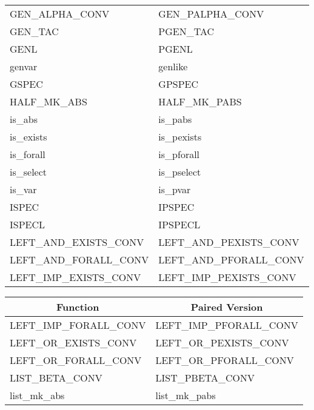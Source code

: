 {\begin{center}
\begin{tabular}[t]{|l|l|}
        GEN\_ALPHA\_CONV            &   GEN\_PALPHA\_CONV           \\
        GEN\_TAC                    &   PGEN\_TAC                   \\
        GENL                        &   PGENL                       \\
        genvar                      &   genlike                     \\
        GSPEC                       &   GPSPEC                      \\
        HALF\_MK\_ABS               &   HALF\_MK\_PABS              \\
        is\_abs                     &   is\_pabs                    \\
        is\_exists                  &   is\_pexists                 \\
        is\_forall                  &   is\_pforall                 \\
        is\_select                  &   is\_pselect                 \\
        is\_var                     &   is\_pvar                    \\
        ISPEC                       &   IPSPEC                      \\
        ISPECL                      &   IPSPECL                     \\
        LEFT\_AND\_EXISTS\_CONV     &   LEFT\_AND\_PEXISTS\_CONV    \\
        LEFT\_AND\_FORALL\_CONV     &   LEFT\_AND\_PFORALL\_CONV    \\
        LEFT\_IMP\_EXISTS\_CONV     &   LEFT\_IMP\_PEXISTS\_CONV    \\  \hline
    \end{tabular}
    \begin{tabular}[t]{|l|l|}                                           \hline
        \multicolumn{1}{|c|}{\normalsize Function}
    &   \multicolumn{1}{|c|}{\normalsize Paired Version}\\              \hline
        LEFT\_IMP\_FORALL\_CONV     &   LEFT\_IMP\_PFORALL\_CONV    \\
        LEFT\_OR\_EXISTS\_CONV      &   LEFT\_OR\_PEXISTS\_CONV     \\
        LEFT\_OR\_FORALL\_CONV      &   LEFT\_OR\_PFORALL\_CONV     \\
        LIST\_BETA\_CONV            &   LIST\_PBETA\_CONV           \\
        list\_mk\_abs               &   list\_mk\_pabs              \\

\end{tabular}
\end{center}}

